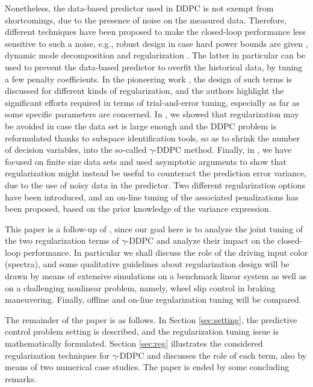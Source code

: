 \documentclass[letterpaper, 10 pt, conference]{ieeeconf}  %
\begin{document}
Nonetheless, the data-based predictor used in DDPC is not exempt from shortcomings, due to the %
presence of noise on the measured data. Therefore, different techniques have been proposed to make the closed-loop performance less sensitive to such a noise, e.g., robust design in case hard power bounds are given \cite{berberich2020data}, dynamic mode decomposition \cite{sassella2022noise} and regularization \cite{dorfler2022bridging}. The latter in particular can be used to prevent the data-based predictor to overfit the historical data, by tuning a few penalty coefficients. In the pioneering work \cite{dorfler2022bridging}, the design of such terms is discussed for different kinds of regularization, and the authors highlight %
the significant efforts required in terms of trial-and-error tuning, especially as far as some specific parameters are concerned. In \cite{breschi2022roleArXiv}, we showed that regularization may be avoided in case the data set is large enough and the DDPC problem is reformulated thanks to subspace identification tools, so as to shrink the number of decision variables, into the so-called $\gamma$-DDPC method. Finally, in \cite{breschi2022uncertainty}, we have %
focused on %
finite size %
data sets and used %
asymptotic arguments to show that regularization might instead be useful to counteract the prediction error variance, due to the use of noisy data in the predictor. Two different regularization options have been introduced, and an on-line tuning of %
the associated penalizations has been proposed, based on the prior knowledge of %
the variance expression.

This paper %
is a follow-up of \cite{breschi2022uncertainty}, since our goal here is to analyze the joint tuning of the two regularization terms of $\gamma$-DDPC and analyze their impact on the closed-loop performance. In particular we shall discuss the role of the driving input color (spectra), and some qualitative guidelines about regularization design will be drawn by means of extensive simulations on a benchmark linear system as well as on a challenging nonlinear problem, namely, wheel slip control in braking maneuvering. Finally, offline and on-line regularization tuning will be compared.

The remainder of the paper is as follows. In Section \ref{sec:setting}, the predictive control problem setting is described, and the regularization tuning issue is mathematically formulated. Section \ref{sec:reg} illustrates the considered regularization techniques for $\gamma$-DDPC and discusses the role of each term, also by means of two numerical case studies. The paper is ended by some concluding remarks.
\end{document}
